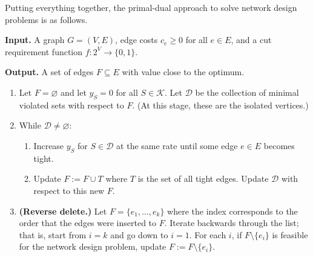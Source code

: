 Putting everything together, the primal-dual approach to solve network 
design problems is as follows.

\begin{mdframed}[
    linewidth=1pt,
    linecolor=black,
    bottomline=false,topline=false,rightline=false,
    innerrightmargin=0pt,innertopmargin=0pt,innerbottommargin=0pt,
    innerleftmargin=1em,%
    skipabove=0.75\baselineskip
]
{\bf Input.} A graph $G = (V, E)$, edge costs $c_e \geq 0$ for 
all $e \in E$, and a cut requirement function $f : 2^V \to \{0, 1\}$. 

{\bf Output.} A set of edges $F \subseteq E$ with value close to the optimum.
\begin{enumerate}[leftmargin=1.75cm, label={Step \arabic*.}]
    \item Let $F = \varnothing$ and let $y_S = 0$ for all $S \in \mathcal{K}$.
    Let $\mathcal{D}$ be the collection of minimal violated sets with respect 
    to $F$. (At this stage, these are the isolated vertices.)

    \item While $\mathcal{D} \neq \varnothing$:
    \begin{enumerate}[label={Step 2.\arabic*.}]
        \item Increase $y_S$ for $S \in \mathcal{D}$ at the same rate 
        until some edge $e \in E$ becomes tight.
        \item Update $F := F \cup T$ where $T$ is the set of all tight edges. 
        Update $\mathcal{D}$ with respect to this new $F$. 
    \end{enumerate}

    \item {\bf (Reverse delete.)} Let $F = \{e_1, \dots, e_k\}$ where the 
    index corresponds to the order that the edges were inserted to $F$. 
    Iterate backwards through the list; that is, start from $i = k$ 
    and go down to $i = 1$. For each $i$, if $F \setminus \{e_i\}$ is feasible 
    for the network design problem, update $F := F \setminus \{e_i\}$.
\end{enumerate}
\end{mdframed}\vspace{-0.25cm}

